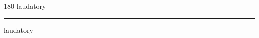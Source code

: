 
\begin{frame}
\begin{center}
\begin{turn}{180}
{\fontsize{2.5cm}{1em}\selectfont laudatory}
\end{turn}
\vspace{1em}\par  
\hrule
\vspace{1em}\par  
{\fontsize{2.5cm}{1em}\selectfont laudatory}
\end{center}
\end{frame}
